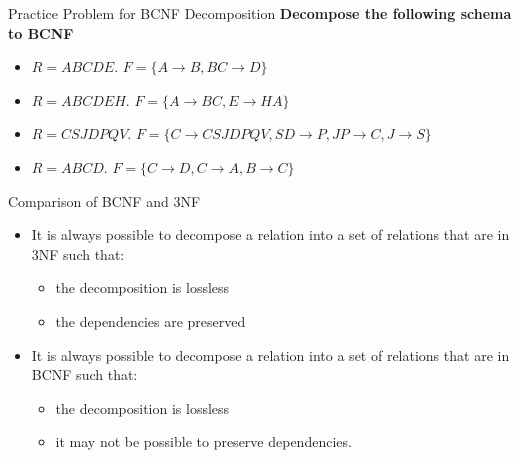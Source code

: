 \documentclass[aspectratio=169, xcolor=dvipsnames]{beamer}
\begin{document}
\begin{frame}{Practice Problem for BCNF Decomposition}
    \textbf{Decompose the following schema to BCNF}
    \begin{itemize}[<+->]
        \item $R = ABCDE$. $F = \{A \rightarrow B, BC \rightarrow D\}$
        \item $R = ABCDEH$. $F = \{A \rightarrow BC, E \rightarrow HA\}$
        \item $R = CSJDPQV$. $F = \{C \rightarrow CSJDPQV, SD \rightarrow P, JP \rightarrow C, J \rightarrow S\}$
        \item $R = ABCD$. $F = \{C \rightarrow D, C \rightarrow A, B \rightarrow C\}$
    \end{itemize}
\end{frame}

\begin{frame}{Comparison of BCNF and 3NF}
    \begin{itemize}[<+->]
        \item It is always possible to decompose a relation into a set of relations that are in 3NF such that:
        \begin{itemize}
            \item[$\triangleright$] the decomposition is lossless
            \item[$\triangleright$] the dependencies are preserved
        \end{itemize}
        \item It is always possible to decompose a relation into a set of relations that are in BCNF such that:
        \begin{itemize}
            \item[$\triangleright$] the decomposition is lossless
            \item[$\triangleright$] it may not be possible to preserve dependencies.
        \end{itemize}
    \end{itemize}
    \begin{table}
    \centering
    \end{table}
\end{frame}
\end{document}
